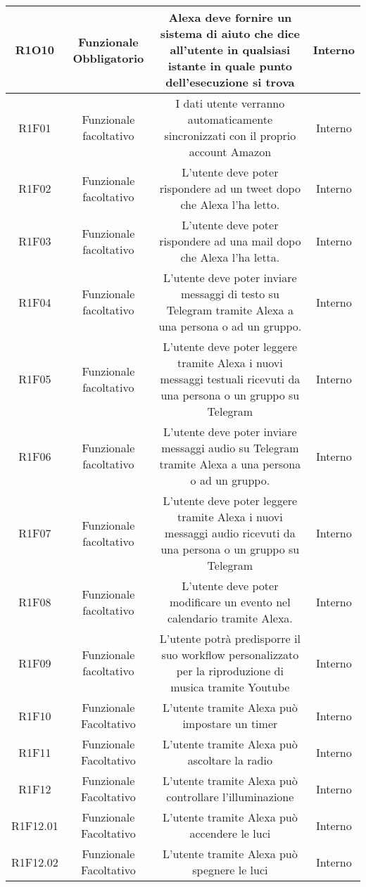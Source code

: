 \begin{tabularx}{\textwidth}{|C|C|C|C|}
	\hline
	R1O10&Funzionale Obbligatorio&Alexa deve fornire un sistema di aiuto che dice all'utente in qualsiasi istante in quale punto dell'esecuzione si trova & Interno\\
	\hline
	R1F01 & Funzionale facoltativo & I dati utente verranno automaticamente sincronizzati con il proprio account Amazon & Interno\\
	\hline
	R1F02 & Funzionale facoltativo & L'utente deve poter rispondere ad un tweet dopo che Alexa l'ha letto. & Interno\\
	\hline
	R1F03 & Funzionale facoltativo & L'utente deve poter rispondere ad una mail dopo che Alexa l'ha letta. & Interno\\
	\hline
	R1F04 & Funzionale facoltativo & L'utente deve poter inviare messaggi di testo su Telegram tramite Alexa a una persona o ad un gruppo. & Interno\\
	\hline
	R1F05 & Funzionale facoltativo & L'utente deve poter leggere tramite Alexa i nuovi messaggi testuali ricevuti da una persona o un gruppo su Telegram  & Interno\\
	\hline
	R1F06 & Funzionale facoltativo & L'utente deve poter inviare messaggi audio su Telegram tramite Alexa a una persona o ad un gruppo.  & Interno\\
	\hline
	R1F07 & Funzionale facoltativo & L'utente deve poter leggere tramite Alexa i nuovi messaggi audio ricevuti da una persona o un gruppo su Telegram   & Interno\\
	\hline
	R1F08 & Funzionale facoltativo & L'utente deve poter modificare un evento nel calendario tramite Alexa. & Interno\\
	\hline
	R1F09 & Funzionale facoltativo & L'utente potrà predisporre il suo workflow personalizzato per la riproduzione di musica tramite Youtube & Interno\\
	\hline
	R1F10&Funzionale Facoltativo  &L'utente tramite Alexa può impostare un timer &Interno \\
	\hline
	R1F11&Funzionale Facoltativo  &L'utente tramite Alexa può ascoltare la radio &Interno \\
	\hline	
	R1F12&Funzionale Facoltativo  &L'utente tramite Alexa può controllare l'illuminazione &Interno \\
	\hline
	R1F12.01&Funzionale Facoltativo  &L'utente tramite Alexa può accendere le luci &Interno \\
	\hline
	R1F12.02&Funzionale Facoltativo  &L'utente tramite Alexa può spegnere le luci &Interno \\
	\hline

\end{tabularx}
